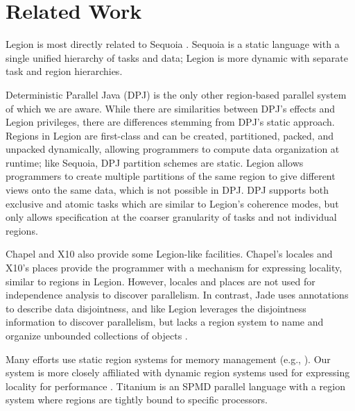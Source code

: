 
\section{Related Work}
\label{sec:related}
Legion is most directly related to Sequoia \cite{Fatahalian06}. 
Sequoia is a static language with a single unified hierarchy
of tasks and data; Legion is more dynamic with separate task and region hierarchies. 

Deterministic Parallel Java (DPJ) is the only other region-based parallel system of which we are
aware\cite{Bocchino09}.  While there are similarities between DPJ's effects and Legion privileges, 
there are differences stemming from DPJ's static approach.
Regions in Legion are first-class and can be created, partitioned, packed, and unpacked 
dynamically, allowing programmers to compute data organization at runtime; like Sequoia, DPJ
partition schemes are static.  Legion allows 
programmers to create multiple partitions of the same region to give different 
views onto the same data, which is not possible in DPJ.  DPJ supports both
exclusive and atomic tasks which are similar to Legion's coherence modes, but only
allows specification at the coarser granularity of tasks and not individual regions.

Chapel \cite{Chamberlain:Chapel} and X10 \cite{X1005} also provide some Legion-like facilities.
Chapel's locales and X10's places provide the programmer with a 
mechanism for expressing locality, similar to regions in Legion.  However, locales 
and places are not used for independence analysis to discover parallelism.
In contrast, Jade uses annotations to describe
data disjointness,  and like Legion leverages the disjointness information
to discover parallelism, but lacks a region system to name and organize unbounded collections of objects \cite{Rinard98}.  


Many efforts use static region systems for  memory management (e.g., \cite{Tofte94, Grossman02}).
Our system is more closely affiliated with dynamic region systems used for expressing locality for performance \cite{Gay01}.
Titanium\cite{TIT98} is an SPMD parallel language with a region system where regions are tightly bound to specific processors.



